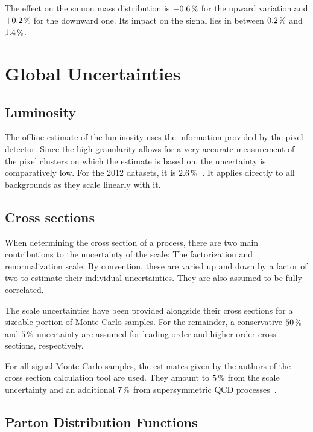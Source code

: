 The effect on the smuon mass distribution is $-0.6\,\pct$ for the upward variation and $+0.2\,\pct$ for the downward one. Its impact on the signal lies in between $0.2\,\pct$ and $1.4\,\pct$. 



\section{Global Uncertainties}
\label{sec:glblsys}

\subsection{Luminosity}
\label{sec:lumisys}

The offline estimate of the luminosity uses the information provided by the pixel detector. Since the high granularity allows for a very accurate measurement of the pixel clusters on which the estimate is based on, the uncertainty is comparatively low. For the 2012 datasets, it is $2.6\,\pct$~\cite{lumisys}. It applies directly to all backgrounds as they scale linearly with it.


\subsection{Cross sections}
\label{sec:xssys}

When determining the cross section of a process, there are two main contributions to the uncertainty of the scale: The factorization and renormalization scale. By convention, these are varied up and down by a factor of two to estimate their individual uncertainties. They are also assumed to be fully correlated.

The scale uncertainties have been provided alongside their cross sections for a sizeable portion of Monte Carlo samples. For the remainder, a conservative $50\,\pct$ and $5\,\pct$ uncertainty are assumed for leading order and higher order cross sections, respectively.

For all signal Monte Carlo samples, the estimates given by the authors of the cross section calculation tool are used. They amount to $5\,\pct$ from the scale uncertainty and an additional $7\,\pct$ from supersymmetric QCD processes~\cite{susyxstool}.


\subsection{Parton Distribution Functions}
\label{sec:pdfsys}

